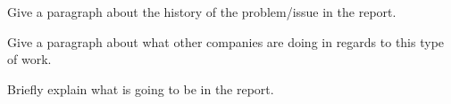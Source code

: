 \begin{Summary}
Give a paragraph about the history of the problem/issue in the report.

Give a paragraph about what other companies are doing in regards to this type of work.

Briefly explain what is going to be in the report.
\end{Summary}
